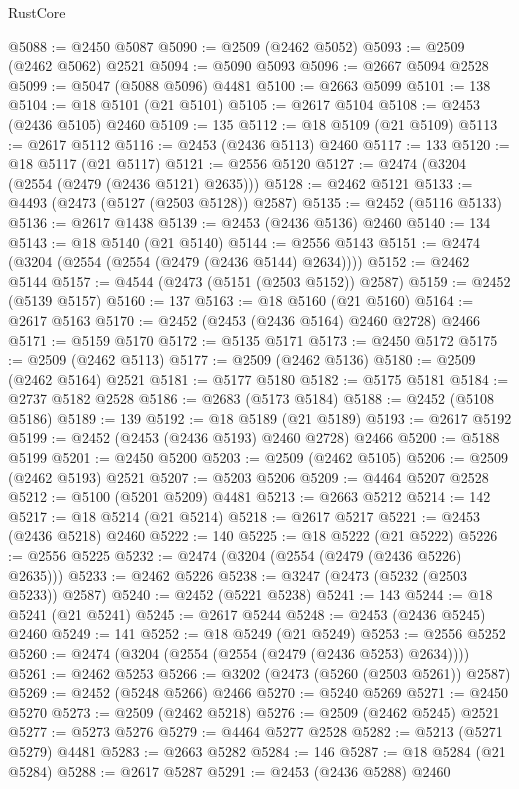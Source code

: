 \begin{lexlean}{RustCore}
\begin{coremodule}
@5088 := @2450 @5087
@5090 := @2509 (@2462 @5052)
@5093 := @2509 (@2462 @5062) @2521
@5094 := @5090 @5093
@5096 := @2667 @5094 @2528
@5099 := @5047 (@5088 @5096) @4481
@5100 := @2663 @5099
@5101 := 138
@5104 := @18 @5101 (@21 @5101)
@5105 := @2617 @5104
@5108 := @2453 (@2436 @5105) @2460
@5109 := 135
@5112 := @18 @5109 (@21 @5109)
@5113 := @2617 @5112
@5116 := @2453 (@2436 @5113) @2460
@5117 := 133
@5120 := @18 @5117 (@21 @5117)
@5121 := @2556 @5120
@5127 := @2474 (@3204 (@2554 (@2479 (@2436 @5121) @2635)))
@5128 := @2462 @5121
@5133 := @4493 (@2473 (@5127 (@2503 @5128)) @2587)
@5135 := @2452 (@5116 @5133)
@5136 := @2617 @1438
@5139 := @2453 (@2436 @5136) @2460
@5140 := 134
@5143 := @18 @5140 (@21 @5140)
@5144 := @2556 @5143
@5151 := @2474 (@3204 (@2554 (@2554 (@2479 (@2436 @5144) @2634))))
@5152 := @2462 @5144
@5157 := @4544 (@2473 (@5151 (@2503 @5152)) @2587)
@5159 := @2452 (@5139 @5157)
@5160 := 137
@5163 := @18 @5160 (@21 @5160)
@5164 := @2617 @5163
@5170 := @2452 (@2453 (@2436 @5164) @2460 @2728) @2466
@5171 := @5159 @5170
@5172 := @5135 @5171
@5173 := @2450 @5172
@5175 := @2509 (@2462 @5113)
@5177 := @2509 (@2462 @5136)
@5180 := @2509 (@2462 @5164) @2521
@5181 := @5177 @5180
@5182 := @5175 @5181
@5184 := @2737 @5182 @2528
@5186 := @2683 (@5173 @5184)
@5188 := @2452 (@5108 @5186)
@5189 := 139
@5192 := @18 @5189 (@21 @5189)
@5193 := @2617 @5192
@5199 := @2452 (@2453 (@2436 @5193) @2460 @2728) @2466
@5200 := @5188 @5199
@5201 := @2450 @5200
@5203 := @2509 (@2462 @5105)
@5206 := @2509 (@2462 @5193) @2521
@5207 := @5203 @5206
@5209 := @4464 @5207 @2528
@5212 := @5100 (@5201 @5209) @4481
@5213 := @2663 @5212
@5214 := 142
@5217 := @18 @5214 (@21 @5214)
@5218 := @2617 @5217
@5221 := @2453 (@2436 @5218) @2460
@5222 := 140
@5225 := @18 @5222 (@21 @5222)
@5226 := @2556 @5225
@5232 := @2474 (@3204 (@2554 (@2479 (@2436 @5226) @2635)))
@5233 := @2462 @5226
@5238 := @3247 (@2473 (@5232 (@2503 @5233)) @2587)
@5240 := @2452 (@5221 @5238)
@5241 := 143
@5244 := @18 @5241 (@21 @5241)
@5245 := @2617 @5244
@5248 := @2453 (@2436 @5245) @2460
@5249 := 141
@5252 := @18 @5249 (@21 @5249)
@5253 := @2556 @5252
@5260 := @2474 (@3204 (@2554 (@2554 (@2479 (@2436 @5253) @2634))))
@5261 := @2462 @5253
@5266 := @3202 (@2473 (@5260 (@2503 @5261)) @2587)
@5269 := @2452 (@5248 @5266) @2466
@5270 := @5240 @5269
@5271 := @2450 @5270
@5273 := @2509 (@2462 @5218)
@5276 := @2509 (@2462 @5245) @2521
@5277 := @5273 @5276
@5279 := @4464 @5277 @2528
@5282 := @5213 (@5271 @5279) @4481
@5283 := @2663 @5282
@5284 := 146
@5287 := @18 @5284 (@21 @5284)
@5288 := @2617 @5287
@5291 := @2453 (@2436 @5288) @2460

\end{coremodule}
\end{lexlean}
